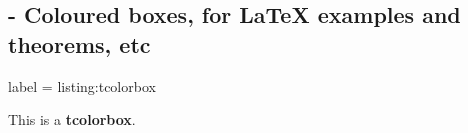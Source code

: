 
\subsection{ - Coloured boxes, for LaTeX examples and theorems, etc}

\begin{tcblisting}{label = listing:tcolorbox}
  \begin{tcolorbox}
    This is a \textbf{tcolorbox}.
  \end{tcolorbox}
\end{tcblisting}
